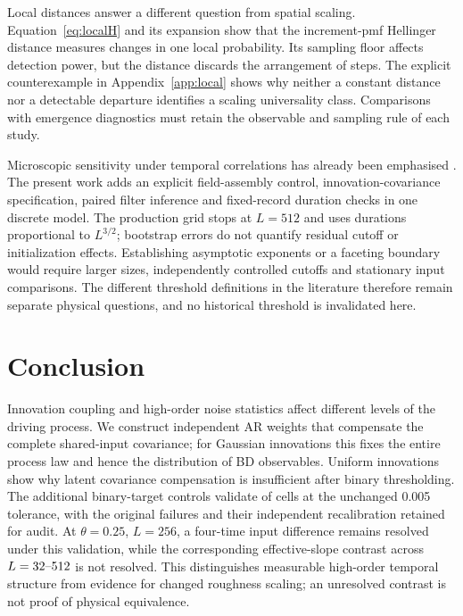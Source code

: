 Local distances answer a different question from spatial scaling.
Equation~\eqref{eq:localH} and its expansion show that the increment-pmf
Hellinger distance measures changes in one local probability. Its sampling
floor affects detection power, but the distance discards the arrangement of
steps. The explicit counterexample in Appendix~\ref{app:local} shows why
neither a constant distance nor a detectable departure identifies a scaling
universality class. Comparisons with emergence diagnostics
\cite{WangXia2025} must retain the observable and sampling rule of each study.

Microscopic sensitivity under temporal correlations has already been
emphasised \cite{RodriguezFernandez2024}. The present work adds an explicit
field-assembly control, innovation-covariance specification, paired filter
inference and fixed-record duration checks in one discrete model. The
production grid stops at $L=512$ and uses durations proportional to $L^{3/2}$;
bootstrap errors do not quantify residual cutoff or initialization effects.
Establishing asymptotic exponents or a faceting boundary would require larger
sizes, independently controlled cutoffs and stationary input comparisons.
The different threshold definitions in the literature therefore remain
separate physical questions, and no historical threshold is invalidated here.

\section{Conclusion}
Innovation coupling and high-order noise statistics affect different levels
of the driving process. We construct independent AR weights that compensate
the complete shared-input covariance; for Gaussian innovations this fixes
the entire process law and hence the distribution of BD observables.
Uniform innovations show why latent covariance compensation is insufficient
after binary thresholding. The additional binary-target controls validate
\InnovationBinaryPass{} of \InnovationCells{} cells at the unchanged
0.005 tolerance, with the original failures and their independent
recalibration retained for audit.
At $\theta=0.25$, $L=256$, a four-time input difference remains resolved
under this validation, while the corresponding effective-slope contrast
across $L=32\mbox{--}512$ is not resolved.
This distinguishes measurable high-order temporal structure from evidence
for changed roughness scaling; an unresolved contrast is not proof of
physical equivalence.

